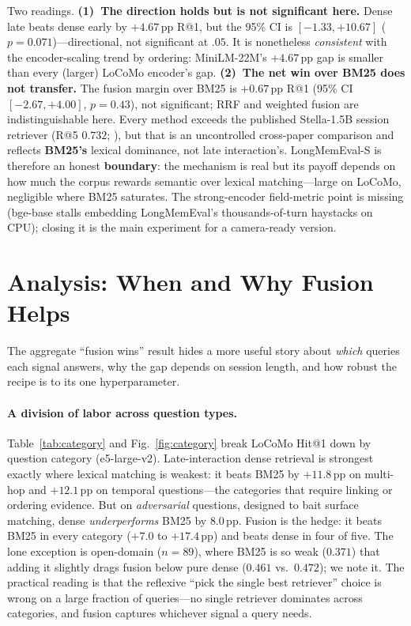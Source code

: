 \documentclass[10pt,twocolumn]{article}
\begin{document}
Two readings. \textbf{(1)~The direction holds but is not significant
here.} Dense late beats dense early by $+4.67$\,pp R@1, but the 95\% CI is
$[-1.33,+10.67]$ ($p{=}0.071$)---directional, not significant at $.05$. It is
nonetheless \emph{consistent} with the encoder-scaling trend by ordering:
MiniLM-22M's $+4.67$\,pp gap is smaller than every (larger) LoCoMo encoder's
gap. \textbf{(2)~The net win over BM25 does not transfer.} The fusion margin
over BM25 is $+0.67$\,pp R@1 (95\% CI $[-2.67,+4.00]$, $p{=}0.43$), not
significant; RRF and weighted fusion are indistinguishable here. Every method
exceeds the published Stella-1.5B session retriever (R@5 $0.732$;
\citealp{longmemeval}), but that is an uncontrolled cross-paper comparison and
reflects \textbf{BM25's} lexical dominance, not late interaction's.
LongMemEval-S is therefore an honest \textbf{boundary}: the mechanism is real
but its payoff depends on how much the corpus rewards semantic over lexical
matching---large on LoCoMo, negligible where BM25 saturates. The
strong-encoder field-metric point is missing (bge-base stalls embedding
LongMemEval's thousands-of-turn haystacks on CPU); closing it is the main
experiment for a camera-ready version.

\section{Analysis: When and Why Fusion Helps}
\label{sec:analysis}
The aggregate ``fusion wins'' result hides a more useful story about
\emph{which} queries each signal answers, why the gap depends on session
length, and how robust the recipe is to its one hyperparameter.

\paragraph{A division of labor across question types.}
Table~\ref{tab:category} and Fig.~\ref{fig:category} break LoCoMo Hit@1 down by
question category (e5-large-v2). Late-interaction dense retrieval is strongest
exactly where lexical matching is weakest: it beats BM25 by $+11.8$\,pp on
multi-hop and $+12.1$\,pp on temporal questions---the categories that require
linking or ordering evidence. But on \emph{adversarial} questions, designed to
bait surface matching, dense \emph{underperforms} BM25 by $8.0$\,pp. Fusion is
the hedge: it beats BM25 in every category ($+7.0$ to $+17.4$\,pp) and beats
dense in four of five. The lone exception is open-domain ($n{=}89$), where BM25
is so weak ($0.371$) that adding it slightly drags fusion below pure dense
($0.461$ vs.\ $0.472$); we note it. The practical
reading is that the reflexive ``pick the single best retriever'' choice is
wrong on a large fraction of queries---no single retriever dominates across
categories, and fusion captures whichever signal a query needs.
\end{document}
